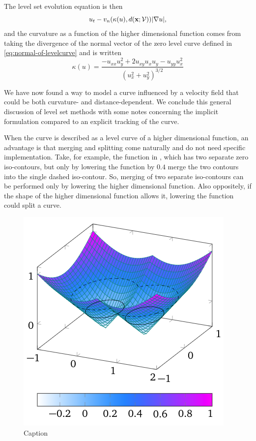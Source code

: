 The level set evolution equation is then
\begin{equation}
    u_t - v_n(\kappa(u), d(\textbf{x};\mathcal{V})) |\nabla u|, 
    \label{eq:level-set-evolution-kappad}
\end{equation}
and the curvature as a function of the higher dimensional function comes from taking the divergence of the normal vector of the zero level curve defined in \eqref{eq:normal-of-levelcurve} and is written
\begin{equation}
    \kappa(u) = \frac{-u_{xx}u_y^2+2u_{xy}u_xu_y - u_{yy}u_x^2}{(u_x^2+u_y^2)^{3/2}}
    \label{eq:curvature-u}
\end{equation}

We have now found a way to model a curve influenced by a velocity field that could be both curvature- and distance-dependent. We conclude this general discussion of level set methods with some notes concerning the implicit formulation compared to an explicit tracking of the curve.

When the curve is described as a level curve of a higher dimensional function, an advantage is that merging and splitting come naturally and do not need specific implementation. Take, for example, the function in , which has two separate zero iso-contours, but only by lowering the function by $0.4$ merge the two contours into the single dashed iso-contour. So, merging of two separate iso-contours can be performed only by lowering the higher dimensional function. Also oppositely, if the shape of the higher dimensional function allows it, lowering the function could split a curve.

\begin{figure}
    \centering
    \includegraphics[width=.5\linewidth]{figures/tikz-figures/levelset-function.png}
    \caption[Level set function and iso-contours]{Caption}
    \label{fig:3d-levelset}
\end{figure}

